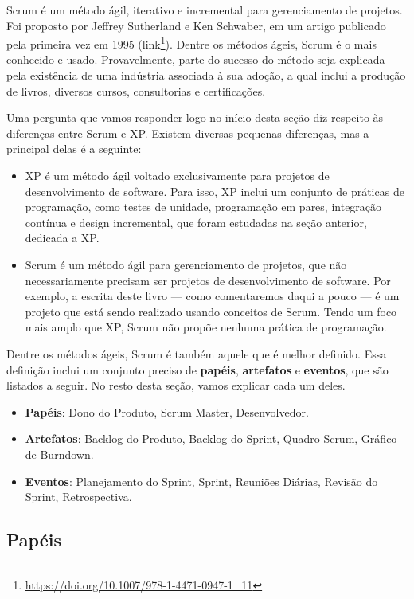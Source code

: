 \documentclass[
  11pt,
  twoside]{book}
\DeclareRobustCommand{\href}[2]{#2\footnote{\url{#1}}}
\begin{document}
   Scrum é
um método ágil, iterativo e incremental para gerenciamento de projetos.
Foi proposto por Jeffrey Sutherland e Ken Schwaber, em um artigo
publicado pela primeira vez em 1995
(\href{https://doi.org/10.1007/978-1-4471-0947-1_11}{link}). Dentre os
métodos ágeis, Scrum é o mais conhecido e usado. Provavelmente, parte do
sucesso do método seja explicada pela existência de uma indústria
associada à sua adoção, a qual inclui a produção de livros, diversos
cursos, consultorias e certificações.

Uma pergunta que vamos responder logo no início desta seção diz respeito
às diferenças entre Scrum e XP. Existem diversas pequenas diferenças,
mas a principal delas é a seguinte:

\begin{itemize}
\item
  XP é um método ágil voltado exclusivamente para projetos de
  desenvolvimento de software. Para isso, XP inclui um conjunto de
  práticas de programação, como testes de unidade, programação em pares,
  integração contínua e design incremental, que foram estudadas na seção
  anterior, dedicada a XP.
\item
  Scrum é um método ágil para gerenciamento de projetos, que não
  necessariamente precisam ser projetos de desenvolvimento de software.
  Por exemplo, a escrita deste livro --- como comentaremos daqui a pouco
  --- é um projeto que está sendo realizado usando conceitos de Scrum.
  Tendo um foco mais amplo que XP, Scrum não propõe nenhuma prática de
  programação.
\end{itemize}

Dentre os métodos ágeis, Scrum é também aquele que é melhor definido.
Essa definição inclui um conjunto preciso de \textbf{papéis},
\textbf{artefatos} e \textbf{eventos}, que são listados a seguir. No
resto desta seção, vamos explicar cada um deles.

\begin{itemize}
\item
  \textbf{Papéis}: Dono do Produto, Scrum Master, Desenvolvedor.
\item
  \textbf{Artefatos}: Backlog do Produto, Backlog do Sprint, Quadro
  Scrum, Gráfico de Burndown.
\item
  \textbf{Eventos}: Planejamento do Sprint, Sprint, Reuniões Diárias,
  Revisão do Sprint, Retrospectiva.
\end{itemize}

\hypertarget{papuxe9is}{%
\subsection{Papéis}\label{papuxe9is}}
\end{document}
